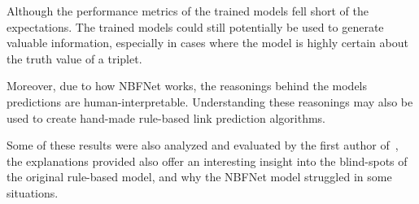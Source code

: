 Although the performance metrics of the trained models fell short of the expectations.
The trained models could still potentially be used to generate valuable information,
especially in cases where the model is highly certain about the truth value of a triplet.

Moreover, due to how NBFNet works, the reasonings behind the models predictions are human-interpretable.
Understanding these reasonings may also be used to create hand-made rule-based link prediction algorithms.

Some of these results were also analyzed and evaluated by the first author of~\cite{YaqutRB}, the
explanations provided also offer an interesting insight into the blind-spots of the original rule-based model,
and why the NBFNet model struggled in some situations. 